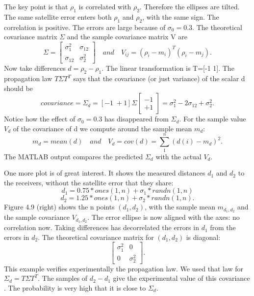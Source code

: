 The key point is that $\rho_1$ is correlated with $\rho_2$. Therefore the ellipses are tilted. The same satellite error enters both $\rho_1$ and $\rho_2$, with the same sign. The correlation is positive. The errors are large because of $\sigma_0=0.3$. The theoretical covariance matrix $\Sigma$ and the sample covariance matrix V are
\begin{equation*}
\Sigma=
\begin{bmatrix}
\sigma^2_1 & \sigma_{12}\\
\sigma_{12} & \sigma^2_2
\end{bmatrix}
\quad and \quad
V_{ij}=(\rho_i-m_i)^T(\rho_i-m_j).
\end{equation*} 
Now take differences $d=\rho_2-\rho_1$. The linear transformation is T=[-1 1]. The
propagation law $T\Sigma T^T$ says that the covariance (or just variance) of the scalar d should be
\begin{equation*}
covariance=\Sigma_d=[-1\; +1]\Sigma
\begin{bmatrix} -1\\+1 \end{bmatrix}
=\sigma^2_1-2\sigma_{12}+\sigma^2_2.
\end{equation*}
Notice how the effect of $\sigma_0=0.3$ has disappeared from $\Sigma_d$. For the sample value $V_d$ of the covariance of d we compute around the sample mean $m_d$:
\begin{equation*}
m_d=mean(d) \quad and \quad
V_d=cov(d)=\sum^n_1(d(i)-m_d)^2.
\end{equation*} 
The MATLAB output compares the predicted $\Sigma_d$ with the actual $V_d$.

One more plot is of great interest. It shows the measured distances $d_1$ and $d_2$ to the
receivers, without the satellite error that they share:
\begin{equation*}
d_1=0.75\ast ones(1,n)+\sigma_1\ast randn(1,n)
\end{equation*}
\begin{equation*}
d_2=1.25\ast ones(1,n)+\sigma_2\ast randn(1,n).
\end{equation*}
Figure 4.9\; (right) shows the n points $(d_1,d_2)$, with the sample mean $m_{d_1,d_2}$ and the sample covariance $V_{d_1,d_2}$. The error ellipse is now aligned with the axes: no correlation now.
Taking differences has decorrelated the errors in $d_1$ from the errors in $d_2$. The theoretical
covariance matrix for $(d_1,d_2)$ is diagonal:
\begin{equation*}
\begin{bmatrix}
\sigma^2_1 & 0 \\
0  & \sigma^2_2
\end{bmatrix}.
\end{equation*}
This example verifies experimentally the propagation law. We used that law for $\Sigma_d=T\Sigma T^T$. The samples of $d_2-d_1$ give the experimental value of this covariance . The probability is very high that it is close to $\Sigma_d$.

